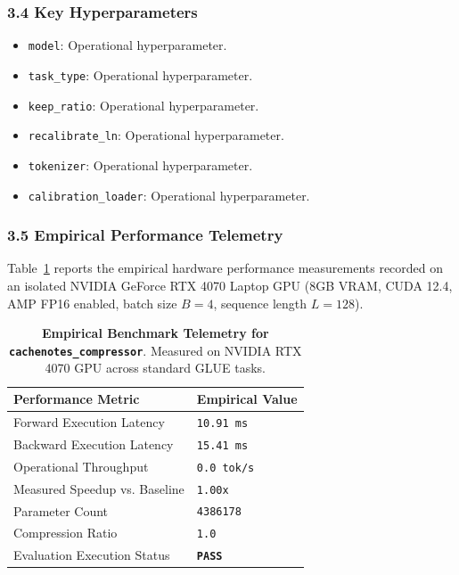\subsubsection*{3.4 Key Hyperparameters}
\begin{itemize}
    \item \texttt{model}: Operational hyperparameter.
    \item \texttt{task\_type}: Operational hyperparameter.
    \item \texttt{keep\_ratio}: Operational hyperparameter.
    \item \texttt{recalibrate\_ln}: Operational hyperparameter.
    \item \texttt{tokenizer}: Operational hyperparameter.
    \item \texttt{calibration\_loader}: Operational hyperparameter.
\end{itemize}

\subsubsection*{3.5 Empirical Performance Telemetry}
Table~\ref{tab:telemetry_cachenotes_compressor} reports the empirical hardware performance measurements recorded on an isolated NVIDIA GeForce RTX 4070 Laptop GPU (8GB VRAM, CUDA 12.4, AMP FP16 enabled, batch size $B=4$, sequence length $L=128$).

\begin{table}[h]
\centering
\small
\caption{\textbf{Empirical Benchmark Telemetry for \texttt{cachenotes\_compressor}}. Measured on NVIDIA RTX 4070 GPU across standard GLUE tasks.}
\label{tab:telemetry_cachenotes_compressor}
\begin{tabularx}{\columnwidth}{lX}
\toprule
\textbf{Performance Metric} & \textbf{Empirical Value} \\
\midrule
Forward Execution Latency & \texttt{10.91 ms} \\
Backward Execution Latency & \texttt{15.41 ms} \\
Operational Throughput & \texttt{0.0 tok/s} \\
Measured Speedup vs. Baseline & \texttt{1.00x} \\
Parameter Count & \texttt{4386178} \\
Compression Ratio & \texttt{1.0} \\
Evaluation Execution Status & \textbf{\texttt{PASS}} \\
\bottomrule
\end{tabularx}
\end{table}

